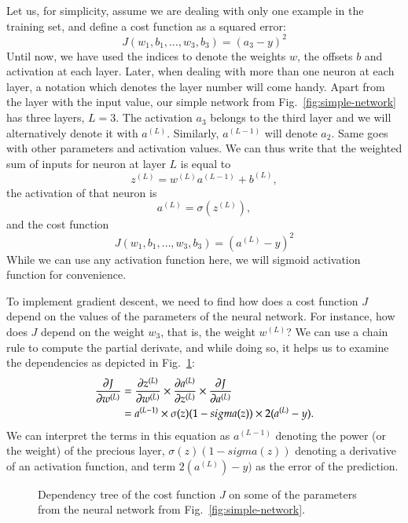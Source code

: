 \begin{refsection}
Let us, for simplicity, assume we are dealing with only one example in the training set, and define a cost function as a squared error:
\begin{equation}
J(w_1, b_1, \ldots, w_3, b_3)=(a_3-y)^2
\end{equation}
Until now, we have used the indices to denote the weights $w$, the offsets $b$ and activation at each layer. Later, when dealing with more than one neuron at each layer, a notation which denotes the layer number will come handy. Apart from the layer with the input value, our simple network from Fig.~\ref{fig:simple-network} has three layers, $L=3$. The activation $a_3$ belongs to the third layer and we will alternatively denote it with $a^{(L)}$. Similarly, $a^{(L-1)}$ will denote $a_2$. Same goes with other parameters and activation values. We can thus write that the weighted sum of inputs for neuron at layer $L$ is equal to
\begin{equation}
z^{(L)}=w^{(L)} a^{(L-1)}+b^{(L)},
\end{equation}
the activation of that neuron is
\begin{equation}
a^{(L)}=\sigma(z^{(L)}),
\end{equation}
and the cost function
\begin{equation}
J(w_1, b_1, \ldots, w_3, b_3)=(a^{(L)}-y)^2
\end{equation}
While we can use any activation function here, we will sigmoid activation function for convenience.

To implement gradient descent, we need to find how does a cost function $J$ depend on the values of the parameters of the neural network. For instance, how does $J$ depend on the weight $w_3$, that is, the weight $w^{(L)}$? We can use a chain rule to compute the partial derivate, and while doing so, it helps us to examine the dependencies as depicted in Fig.~\ref{fig:dependency-tree}:
\begin{align}
\frac{\partial J}{\partial w^{(L)}} & = \frac{\partial z^{(L)}}{\partial w^{(L)}} \times \frac{\partial a^{(L)}}{\partial z^{(L)}} \times \frac{\partial J}{\partial a^{(L)}}\\
& = a^{(L-1)} \times \sigma(z)(1-sigma(z)) \times 2(a^{(L)}-y).
\end{align}
We can interpret the terms in this equation as $a^{(L-1)}$ denoting the power (or the weight) of the precious layer, $\sigma(z)(1-sigma(z))$ denoting a derivative of an activation function, and term $2(a^{(L)})-y)$ as the error of the prediction.

\begin{figure}[htbp]
\caption{Dependency tree of the cost function $J$ on some of the parameters from the neural network from Fig.~\ref{fig:simple-network}.}
\label{fig:dependency-tree}
\end{figure}


\end{refsection}

